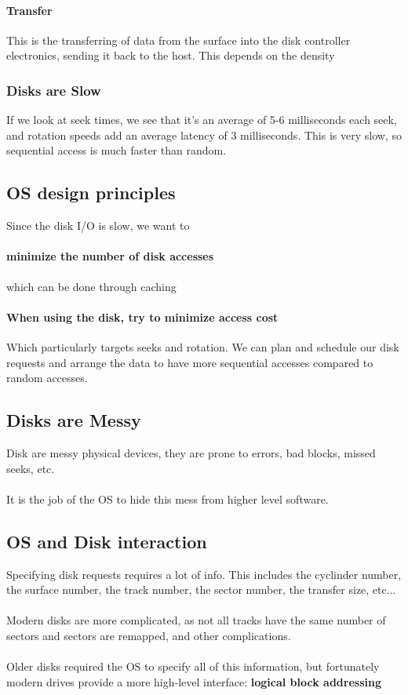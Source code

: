\documentclass{article}
\begin{document}
\paragraph{Transfer} This is the transferring of data from the surface into the disk controller electronics, sending it back to the host. This depends on the density

\subsubsection{Disks are Slow}

If we look at seek times,  we see that it's an average of 5-6 milliseconds each seek, and rotation speeds add an average latency of 3 milliseconds. This is very slow, so sequential access is much faster than random.

\subsection{OS design principles}

Since the disk I\slash O is slow, we want to
\paragraph{minimize the number of disk accesses} which can be done through caching
\paragraph{When using the disk, try to minimize access cost} Which particularly targets seeks and rotation. We can plan and schedule our disk requests and arrange the data to have more sequential accesses compared to random accesses.

\subsection{Disks are Messy}

Disk are messy physical devices, they are prone to errors, bad blocks, missed seeks, etc.
\\
\\
It is the job of the OS to hide this mess from higher level software.

\subsection{OS and Disk interaction}

Specifying disk requests requires a lot of info. This includes the cyclinder number, the surface number, the track number, the sector number, the transfer size, etc...
\\
\\
Modern disks are more complicated, as not all tracks have the same number of sectors and sectors are remapped, and other complications.
\\
\\
Older disks required the OS to specify all of this information, but fortunately modern drives provide a more high-level interface: \textbf{logical block addressing}
\end{document}
